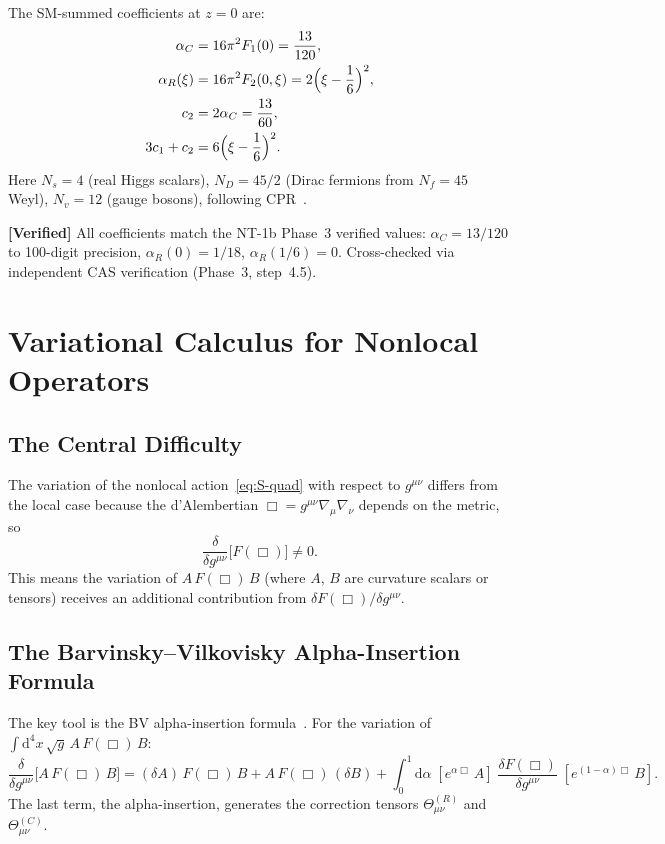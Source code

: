 \documentclass[11pt,a4paper]{article}
\renewcommand{\dd}{\mathrm{d}}
\theoremstyle{plain}
\theoremstyle{definition}
\newcommand{\verified}[1]{%
  \par\smallskip\noindent
  \colorbox{green!10}{\parbox{\dimexpr\linewidth-2\fboxsep}{%
    \textcolor{green!50!black}{\textbf{[Verified]}} #1}}%
  \par\smallskip}
\begin{document}
The SM-summed coefficients at $z = 0$ are:
\begin{align}
  \alpha_C &= 16\pi^2 F_1(0) = \frac{13}{120},
  \label{eq:alphaC}\\
  \alpha_R(\xi) &= 16\pi^2 F_2(0,\xi) = 2\Bigl(\xi - \frac{1}{6}\Bigr)^2,
  \label{eq:alphaR}\\
  c_2 &= 2\alpha_C = \frac{13}{60},
  \label{eq:c2}\\
  3c_1 + c_2 &= 6\Bigl(\xi - \frac{1}{6}\Bigr)^2.
  \label{eq:3c1c2}
\end{align}
Here $N_s = 4$ (real Higgs scalars), $N_D = 45/2$ (Dirac fermions from
$N_f = 45$ Weyl), $N_v = 12$ (gauge bosons), following
CPR~\cite{CPR09}.

\verified{All coefficients match the NT-1b Phase~3 verified values:
$\alpha_C = 13/120$ to 100-digit precision, $\alpha_R(0) = 1/18$,
$\alpha_R(1/6) = 0$. Cross-checked via independent CAS verification (Phase~3, step~4.5).}

\section{Variational Calculus for Nonlocal Operators}
\label{sec:variation}

\subsection{The Central Difficulty}

The variation of the nonlocal action~\eqref{eq:S-quad} with respect to
$g^{\mu\nu}$ differs from the local case because the d'Alembertian
$\Box = g^{\mu\nu}\nabla_\mu\nabla_\nu$ depends on the metric, so
\begin{equation}\label{eq:delta-commutator}
  \frac{\delta}{\delta g^{\mu\nu}}\bigl[F(\Box)\bigr] \neq 0.
\end{equation}
This means the variation of $A\,F(\Box)\,B$ (where $A$, $B$ are
curvature scalars or tensors) receives an additional contribution
from $\delta F(\Box)/\delta g^{\mu\nu}$.

\subsection{The Barvinsky--Vilkovisky Alpha-Insertion Formula}

The key tool is the BV alpha-insertion
formula~\cite{BV87,BV90}. For the variation of
$\int\dd^4 x\,\sqrt{g}\,A\,F(\Box)\,B$:
\begin{equation}\label{eq:alpha-insertion}
  \frac{\delta}{\delta g^{\mu\nu}}\bigl[A\,F(\Box)\,B\bigr]
  = (\delta A)\,F(\Box)\,B + A\,F(\Box)\,(\delta B)
  + \int_0^1\dd\alpha\;
  [e^{\alpha\Box}\,A]\;\frac{\delta F(\Box)}{\delta g^{\mu\nu}}
  \;[e^{(1-\alpha)\Box}\,B].
\end{equation}
The last term, the alpha-insertion, generates the correction tensors
$\Theta^{(R)}_{\mu\nu}$ and $\Theta^{(C)}_{\mu\nu}$.
\end{document}
